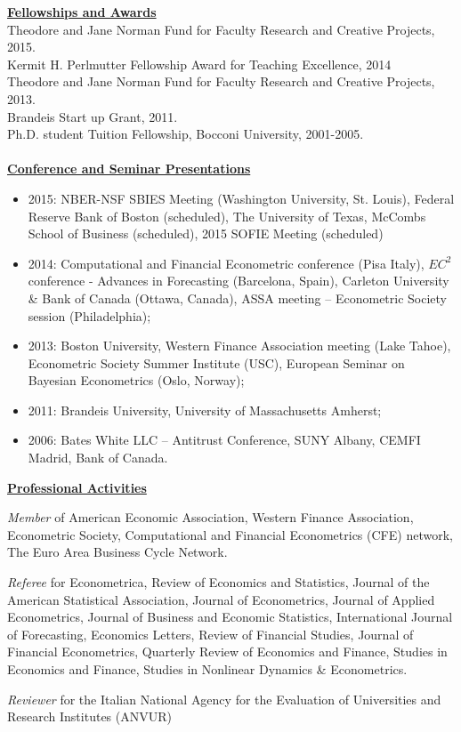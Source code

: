 \documentclass[12pt]{article}
\begin{document}
\underline{\textbf{Fellowships and Awards}}\\
Theodore and Jane Norman Fund for Faculty Research and Creative Projects, 2015. \\
Kermit H. Perlmutter Fellowship Award for Teaching Excellence, 2014 \\
Theodore and Jane Norman Fund for Faculty Research and Creative Projects, 2013. \\
Brandeis Start up Grant, 2011. \\
Ph.D. student Tuition Fellowship, Bocconi University, 2001-2005.\\ \\
\underline{\textbf{Conference and Seminar Presentations}}
\begin{itemize}
  \item 2015: NBER-NSF SBIES Meeting (Washington University, St. Louis), Federal Reserve Bank of Boston (scheduled), The University of Texas, McCombs School of Business (scheduled), 2015 SOFIE Meeting (scheduled)
	\item 2014: Computational and Financial Econometric conference (Pisa Italy), $EC^2$ conference - Advances in Forecasting (Barcelona, Spain),  Carleton University & Bank of Canada (Ottawa, Canada), ASSA meeting -- Econometric Society session (Philadelphia);  
	\item 2013: Boston University, Western Finance Association meeting (Lake Tahoe), Econometric Society Summer Institute (USC), European Seminar on Bayesian Econometrics (Oslo, Norway); 
	\item 2011: Brandeis University, University of Massachusetts Amherst; 
	\item 2006: Bates White LLC -- Antitrust Conference, SUNY Albany, CEMFI Madrid, Bank of Canada.
\end{itemize}

\underline{\textbf{Professional Activities}}
\begin{description}
\item\emph{Member} of American Economic Association, Western Finance Association, Econometric Society, Computational and Financial Econometrics (CFE) network, The Euro Area Business Cycle Network.

\item \emph{Referee} for Econometrica, Review of Economics and Statistics, Journal of the American Statistical Association, Journal of Econometrics, Journal of Applied Econometrics, Journal of Business and Economic Statistics, International Journal of Forecasting, Economics Letters, Review of Financial Studies, Journal of Financial Econometrics, Quarterly Review of Economics and Finance, Studies in Economics and Finance, Studies in Nonlinear Dynamics & Econometrics.

\item \emph{Reviewer} for the Italian National Agency for the Evaluation of Universities and Research Institutes (ANVUR) 
\end{description}
 
\end{document}
